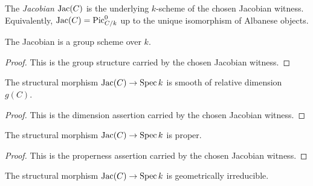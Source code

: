 \begin{definition}[Jacobian]
  \label{def:Jacobian}
  The \emph{Jacobian} \(\mathrm{Jac}(C)\) is the underlying \(k\)-scheme of the
  chosen Jacobian witness.  Equivalently, \(\mathrm{Jac}(C)=\operatorname{Pic}^0_{C/k}\) up to the
  unique isomorphism of Albanese objects.
\end{definition}

\begin{theorem}
  \label{thm:Jacobian_grpObj}
  The Jacobian is a group scheme over \(k\).
\end{theorem}

\begin{proof}
  This is the group structure carried by the chosen Jacobian witness.
\end{proof}

\begin{theorem}
  \label{thm:Jacobian_smooth_genus}
  The structural morphism \(\mathrm{Jac}(C)\to\operatorname{Spec} k\) is smooth of relative
  dimension \(g(C)\).
\end{theorem}

\begin{proof}
  This is the dimension assertion carried by the chosen Jacobian witness.
\end{proof}

\begin{theorem}[Properness]
  \label{thm:Jacobian_proper}
  The structural morphism \(\mathrm{Jac}(C)\to\operatorname{Spec} k\) is proper.
\end{theorem}

\begin{proof}
  This is the properness assertion carried by the chosen Jacobian witness.
\end{proof}

\begin{theorem}
  \label{thm:Jacobian_geomIrred}
  The structural morphism \(\mathrm{Jac}(C)\to\operatorname{Spec} k\) is geometrically irreducible.
\end{theorem}

